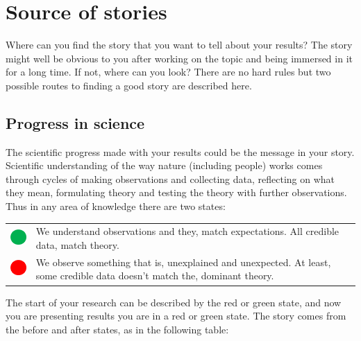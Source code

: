 \documentclass[
  titlepage]{book}
\begin{document}
\hypertarget{source-of-stories}{%
\section{Source of stories}\label{source-of-stories}}

Where can you find the story that you want to tell about your results? The story might well be obvious to you after working on the topic and being immersed in it for a long time. If not, where can you look? There are no hard rules but two possible routes to finding a good story are described here.

\hypertarget{progress-in-science}{%
\subsection{Progress in science}\label{progress-in-science}}

The scientific progress made with your results could be the message in your story. Scientific understanding of the way nature (including people) works comes through cycles of making observations and collecting data, reflecting on what they mean, formulating theory and testing the theory with further observations. Thus in any area of knowledge there are two states:

\begin{longtable}[]{@{}ll@{}}
\toprule
\endhead
\includegraphics{img/Green dot.png} & We understand observations and they, match expectations. All credible data, match theory. \\
\includegraphics{img/Red dot.png} & We observe something that is, unexplained and unexpected. At least, some credible data doesn't match the, dominant theory. \\
\bottomrule
\end{longtable}

The start of your research can be described by the red or green state, and now you are presenting results you are in a red or green state. The story comes from the before and after states, as in the following table:
\end{document}
